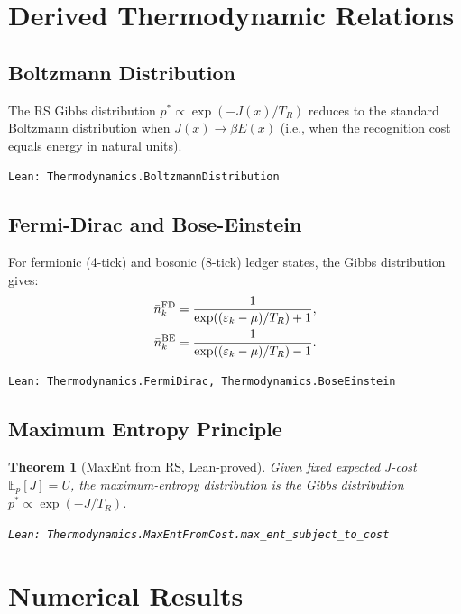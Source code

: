 \documentclass[12pt,a4paper]{article}
\newtheorem{theorem}{Theorem}[section]
\theoremstyle{definition}
\theoremstyle{remark}
\begin{document}
\section{Derived Thermodynamic Relations}

\subsection{Boltzmann Distribution}

The RS Gibbs distribution $p^* \propto \exp(-J(x)/T_R)$ reduces to
the standard Boltzmann distribution when $J(x) \to \beta E(x)$
(i.e., when the recognition cost equals energy in natural units).

\texttt{Lean: Thermodynamics.BoltzmannDistribution}

\subsection{Fermi-Dirac and Bose-Einstein}

For fermionic (4-tick) and bosonic (8-tick) ledger states, the
Gibbs distribution gives:
\begin{align}
  \bar{n}_k^{\rm FD} &= \frac{1}{\exp((\varepsilon_k - \mu)/T_R) + 1}, \\
  \bar{n}_k^{\rm BE} &= \frac{1}{\exp((\varepsilon_k - \mu)/T_R) - 1}.
\end{align}

\texttt{Lean: Thermodynamics.FermiDirac, Thermodynamics.BoseEinstein}

\subsection{Maximum Entropy Principle}

\begin{theorem}[MaxEnt from RS, Lean-proved]\label{thm:maxent}
Given fixed expected J-cost $\mathbb{E}_p[J] = U$, the maximum-entropy
distribution is the Gibbs distribution $p^* \propto \exp(-J/T_R)$.

\texttt{Lean: Thermodynamics.MaxEntFromCost.max\_ent\_subject\_to\_cost}
\end{theorem}

\section{Numerical Results}
\end{document}
